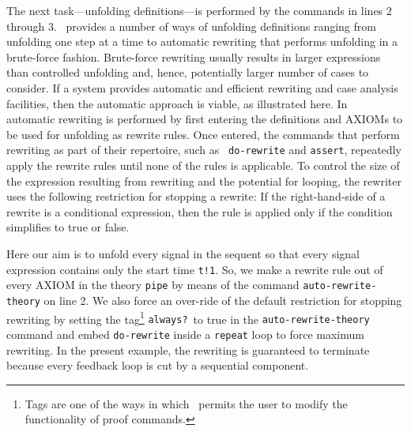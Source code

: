 The next task---unfolding definitions---is performed by the commands
in lines 2 through 3.  \pvs\ provides a number of ways of unfolding
definitions ranging from unfolding one step at a time to automatic
rewriting that performs unfolding in a brute-force fashion.
Brute-force rewriting usually results in larger expressions than
controlled unfolding and, hence, potentially larger number of cases to
consider.  If a system provides automatic and efficient rewriting and
case analysis facilities, then the automatic approach is viable,
as illustrated here.  In \pvs\, automatic rewriting is performed
by first entering the definitions and AXIOMs to be used
for unfolding as rewrite rules.  Once entered, the commands that
perform rewriting as part of their repertoire, such as {\tt
do-rewrite} and {\tt assert}, repeatedly apply the rewrite rules until
none of the rules is applicable.  To control the size of the
expression resulting from rewriting and the potential for looping, the
rewriter uses the following restriction for stopping a rewrite: If the
right-hand-side of a rewrite is a conditional expression, then the
rule is applied only if the condition simplifies to true or false.

Here our aim is to unfold every signal in
the sequent so that every signal expression contains only the
start time {\tt t!1}.
So, we make a rewrite rule out of every AXIOM in the theory {\tt pipe}
by means of the command {\tt auto-rewrite-theory} on line 2.
We also force an over-ride of the default restriction for stopping rewriting by
setting the tag\footnote{Tags are one of the ways in which \pvs\ permits the user to modify
the functionality of proof commands.} {\tt always?}\ to true in the {\tt auto-rewrite-theory}
command and embed {\tt do-rewrite} inside a {\tt repeat} loop to force
maximum rewriting.
In the present example, the rewriting
is guaranteed to terminate because every feedback loop is cut by a sequential
component.

